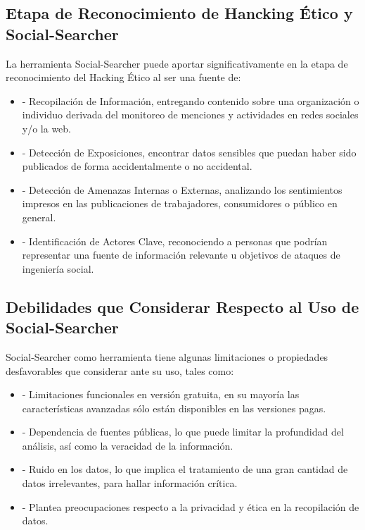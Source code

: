 \documentclass[stu, 11pt, letterpaper, donotrepeattitle, floatsintext, natbib]{apa7}
\begin{document}
\subsection{Etapa de Reconocimiento de Hancking Ético y Social-Searcher}

La herramienta Social-Searcher puede aportar significativamente en la etapa de reconocimiento del Hacking Ético al ser una fuente de:

\begin{itemize}
\item[] - Recopilación de Información, entregando contenido sobre una organización o individuo derivada del monitoreo de menciones y actividades en redes sociales y/o la web.
\item[] - Detección de Exposiciones, encontrar datos sensibles que puedan haber sido publicados de forma accidentalmente o no accidental.
\item[] - Detección de Amenazas Internas o Externas, analizando los sentimientos impresos en las publicaciones de trabajadores, consumidores o público en general.
\item[] - Identificación de Actores Clave, reconociendo a personas que podrían representar una fuente de información relevante u objetivos de ataques de ingeniería social.
\end{itemize}

\subsection{Debilidades que Considerar Respecto al Uso de Social-Searcher}

Social-Searcher como herramienta tiene algunas limitaciones o propiedades desfavorables que considerar ante su uso, tales como:

\begin{itemize}
\item[] - Limitaciones funcionales en versión gratuita, en su mayoría las características avanzadas sólo están disponibles en las versiones pagas.
\item[] - Dependencia de fuentes públicas, lo que puede limitar la profundidad del análisis, así como la veracidad de la información.
\item[] - Ruido en los datos, lo que implica el tratamiento de una gran cantidad de datos irrelevantes, para hallar información crítica.
\item[] - Plantea preocupaciones respecto a la privacidad y ética en la recopilación de datos.
\end{itemize}
\end{document}
